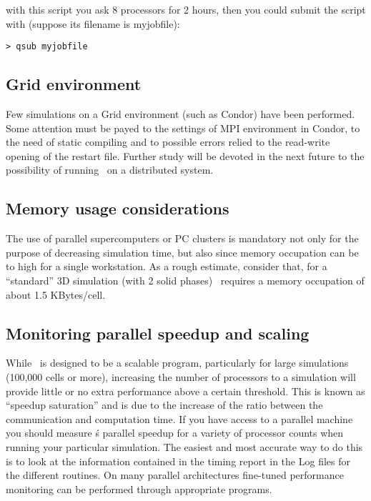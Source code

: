 with this script you ask 8 processors for 2 hours, then
you could submit the script with 
(suppose its filename is myjobfile):

\begin{verbatim}
> qsub myjobfile
\end{verbatim}

\subsection{Grid environment}

Few simulations on a Grid environment (such as Condor) have been performed.
Some attention must be payed to the settings of MPI environment in Condor,
to the need of static compiling and to possible errors relied to the
read-write opening of the restart file. Further study will be devoted in
the next future to the possibility of running \PDAC\ on a distributed
system.

\subsection{Memory usage considerations}
The use of parallel supercomputers or PC clusters is mandatory not only
for the purpose of decreasing simulation time, but also since memory
occupation can be to high for a single workstation. As a rough estimate,
consider that, for a ``standard'' 3D simulation (with 2 solid phases) 
\PDAC\ requires a memory occupation of about 1.5 KBytes/cell. 

\subsection{Monitoring parallel speedup and scaling}

While \PDAC\ is designed to be a scalable program, particularly for
large simulations (100,000 cells or more), increasing the number of
processors to a simulation will provide little or no extra performance
above a certain threshold. This is known as ``speedup saturation'' and is
due to the increase of the ratio between the communication and computation
time. If you have access to a parallel machine you should
measure \PDAC\'s parallel speedup for a variety of processor counts when
running your particular simulation. The easiest and most accurate way
to do this is to look at the information contained in the timing report
in the Log files for the different routines. On many parallel architectures
fine-tuned performance monitoring can be performed through appropriate programs.
